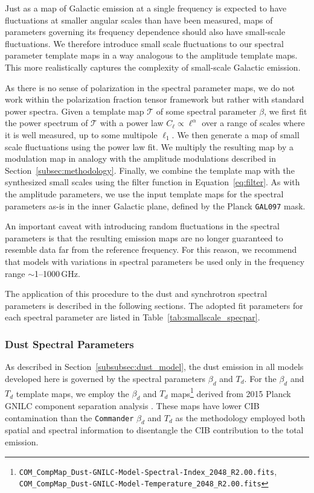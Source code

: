 \documentclass[twocolumn]{aastex631}
\begin{document}
Just as a map of Galactic emission at a single frequency is expected to have fluctuations at smaller angular scales than have been measured, maps of parameters governing its frequency dependence should also have small-scale fluctuations. We therefore introduce small scale fluctuations to our spectral parameter template maps in a way analogous to the amplitude template maps. This more realistically captures the complexity of small-scale Galactic emission.

As there is no sense of polarization in the spectral parameter maps, we do not work within the polarization fraction tensor framework but rather with standard power spectra. Given a template map $\mathcal{T}$ of some spectral parameter $\beta$, we first fit the power spectrum of $\mathcal{T}$ with a power law $C_\ell \propto \ell^\alpha$ over a range of scales where it is well measured, up to some multipole $\ell_1$. We then generate a map of small scale fluctuations using the power law fit. We multiply the resulting map by a modulation map in analogy with the amplitude modulations described in Section~\ref{subsec:methodology}. Finally, we combine the template map with the synthesized small scales using the filter function in Equation~\ref{eq:filter}. As with the amplitude parameters, we use the input template maps for the spectral parameters as-is in the inner Galactic plane, defined by the Planck \texttt{GAL097} mask.

An important caveat with introducing random fluctuations in the spectral parameters is that the resulting emission maps are no longer guaranteed to resemble data far from the reference frequency. For this reason, we recommend that models with variations in spectral parameters be used only in the frequency range $\sim$1--1000\,GHz.

The application of this procedure to the dust and synchrotron spectral parameters is described in the following sections. The adopted fit parameters for each spectral parameter are listed in Table~\ref{tab:smallscale_specpar}.

\subsubsection{Dust Spectral Parameters}\label{subsec:dust_spec_params}
As described in Section~\ref{subsubsec:dust_model}, the dust emission in all models developed here is governed by the spectral parameters $\beta_d$ and $T_d$. For the $\beta_d$ and $T_d$ template maps, we employ the $\beta_d$ and $T_d$ maps\footnote{\texttt{COM\_CompMap\_Dust-GNILC-Model-Spectral-Index\_2048\_R2.00.fits}, \texttt{COM\_CompMap\_Dust-GNILC-Model-Temperature\_2048\_R2.00.fits}} derived from 2015 Planck GNILC component separation analysis \citep{planck2016-XLVIII}. These maps have lower CIB contamination than the \texttt{Commander} $\beta_d$ and $T_d$ \citep{planck2014-a12} as the methodology employed both spatial and spectral information to disentangle the CIB contribution to the total emission.
\end{document}
